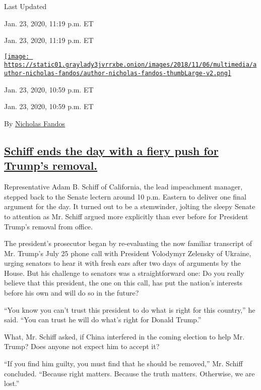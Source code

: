Last Updated

Jan. 23, 2020, 11:19 p.m. ET

Jan. 23, 2020, 11:19 p.m. ET

\href{https://www.nytimes3xbfgragh.onion/by/nicholas-fandos}{\texttt{[image: https://static01.graylady3jvrrxbe.onion/images/2018/11/06/multimedia/author-nicholas-fandos/author-nicholas-fandos-thumbLarge-v2.png]}}

Jan. 23, 2020, 10:59 p.m. ET

Jan. 23, 2020, 10:59 p.m. ET

By \href{https://www.nytimes3xbfgragh.onion/by/nicholas-fandos}{Nicholas
Fandos}

\hypertarget{schiff-ends-the-day-with-a-fiery-push-for-trumps-removal}{%
\subsection{\texorpdfstring{\protect\hyperlink{schiff-trump-removal}{Schiff
ends the day with a fiery push for Trump's
removal.}}{Schiff ends the day with a fiery push for Trump's removal.}}\label{schiff-ends-the-day-with-a-fiery-push-for-trumps-removal}}

Representative Adam B. Schiff of California, the lead impeachment
manager, stepped back to the Senate lectern around 10 p.m. Eastern to
deliver one final argument for the day. It turned out to be a
stemwinder, jolting the sleepy Senate to attention as Mr. Schiff argued
more explicitly than ever before for President Trump's removal from
office.

The president's prosecutor began by re-evaluating the now familiar
transcript of Mr. Trump's July 25 phone call with President Volodymyr
Zelensky of Ukraine, urging senators to hear it with fresh ears after
two days of arguments by the House. But his challenge to senators was a
straightforward one: Do you really believe that this president, the one
on this call, has put the nation's interests before his own and will do
so in the future?

``You know you can't trust this president to do what is right for this
country,'' he said. ``You can trust he will do what's right for Donald
Trump.''

What, Mr. Schiff asked, if China interfered in the coming election to
help Mr. Trump? Does anyone not expect him to accept it?

``If you find him guilty, you must find that he should be removed,'' Mr.
Schiff concluded. ``Because right matters. Because the truth matters.
Otherwise, we are lost.''

